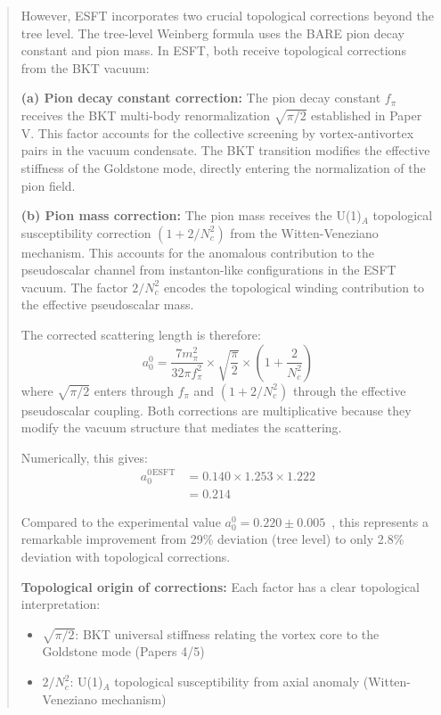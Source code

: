 ﻿\documentclass[twocolumn,prd,amsmath,amssymb,aps]{revtex4-2}
\begin{document}
\begin{abstract}
However, ESFT incorporates two crucial topological corrections beyond the tree level. The tree-level Weinberg formula uses the BARE pion decay constant and pion mass. In ESFT, both receive topological corrections from the BKT vacuum:

\textbf{(a) Pion decay constant correction:} The pion decay constant $f_\pi$ receives the BKT multi-body renormalization $\sqrt{\pi/2}$ established in Paper V. This factor accounts for the collective screening by vortex-antivortex pairs in the vacuum condensate. The BKT transition modifies the effective stiffness of the Goldstone mode, directly entering the normalization of the pion field.

\textbf{(b) Pion mass correction:} The pion mass receives the U(1)$_A$ topological susceptibility correction $(1 + 2/N_c^2)$ from the Witten-Veneziano mechanism. This accounts for the anomalous contribution to the pseudoscalar channel from instanton-like configurations in the ESFT vacuum. The factor $2/N_c^2$ encodes the topological winding contribution to the effective pseudoscalar mass.

The corrected scattering length is therefore:
\begin{equation}
a_0^0 = \frac{7 m_\pi^2}{32\pi f_\pi^2} \times \sqrt{\frac{\pi}{2}} \times \left(1 + \frac{2}{N_c^2}\right)
\end{equation}
where $\sqrt{\pi/2}$ enters through $f_\pi$ and $(1 + 2/N_c^2)$ through the effective pseudoscalar coupling. Both corrections are multiplicative because they modify the vacuum structure that mediates the scattering.

Numerically, this gives:
\begin{align}
a_0^0^{\text{ESFT}} &= 0.140 \times 1.253 \times 1.222 \nonumber \\
&= 0.214
\label{eq:esft_full_scattering_length}
\end{align}

Compared to the experimental value $a_0^0 = 0.220 \pm 0.005$~\cite{PDG2024}, this represents a remarkable improvement from 29\% deviation (tree level) to only 2.8\% deviation with topological corrections.

\textbf{Topological origin of corrections:} Each factor has a clear topological interpretation:
\begin{itemize}
\item $\sqrt{\pi/2}$: BKT universal stiffness relating the vortex core to the Goldstone mode (Papers 4/5)
\item $2/N_c^2$: U(1)$_A$ topological susceptibility from axial anomaly (Witten-Veneziano mechanism)
\end{itemize}



\end{abstract}
\end{document}

